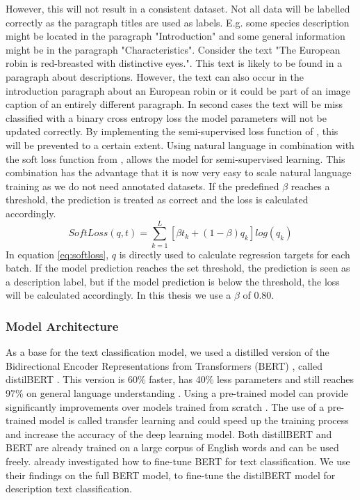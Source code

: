 \documentclass[a4paper, 12pt, oneside]{book} %
\begin{document}
However, this will not result in a consistent dataset.
Not all data will be labelled correctly as the paragraph titles are used as labels.
E.g. some species description might be located in the paragraph "Introduction" and some general information might be in the paragraph "Characteristics".
Consider the text "The European robin is red-breasted with distinctive eyes.".
This text is likely to be found in a paragraph about descriptions.
However, the text can also occur in the introduction paragraph about an European robin or it could be part of an image caption of an entirely different paragraph. 
In second cases the text will be miss classified with a binary cross entropy loss the model parameters will not be updated correctly. 
By implementing the semi-supervised loss function of \textcite{reed_training_2015}, this will be prevented to a certain extent.
Using natural language in combination with the soft loss function from \textcite{reed_training_2015}, allows the model for semi-supervised learning.
This combination has the advantage that it is now very easy to scale natural language training as we do not need annotated datasets.
If the predefined \(\beta\) reaches a threshold, the prediction is treated as correct and the loss is calculated accordingly.
\begin{equation} \label{eq:softloss}
 SoftLoss(q, t) = \sum_{k=1}^{L}[\beta t _k + (1- \beta )q _k]log(q _k)
\end{equation}
In equation \ref{eq:softloss}, \(q\) is directly used to calculate regression targets for each batch.
If the model prediction reaches the set threshold, the prediction is seen as a description label, but if the model prediction is below the threshold, the loss will be calculated accordingly.
In this thesis we use a \(\beta\) of 0.80. 

\subsubsection{Model Architecture} \label{par:Architecture}
As a base for the text classification model, we used a distilled version of the Bidirectional Encoder Representations from Transformers (BERT) \autocite{devlin_bert_2019}, called distilBERT \autocite{sanh_distilbert_2020}. 
This version is 60\% faster, has 40\% less parameters and still reaches 97\% on general language understanding \autocite{sanh_distilbert_2020}.
Using a pre-trained model can provide significantly improvements over models trained from scratch \autocite{mikolov_distributed_2013}.
The use of a pre-trained model is called transfer learning and could speed up the training process and increase the accuracy of the deep learning model.
Both distillBERT and BERT are already trained on a large corpus of English words and can be used freely.
\textcite{sun_how_2020} already investigated how to fine-tune BERT for text classification.
We use their findings on the full BERT model, to fine-tune the distilBERT model for description text classification.
\end{document}
